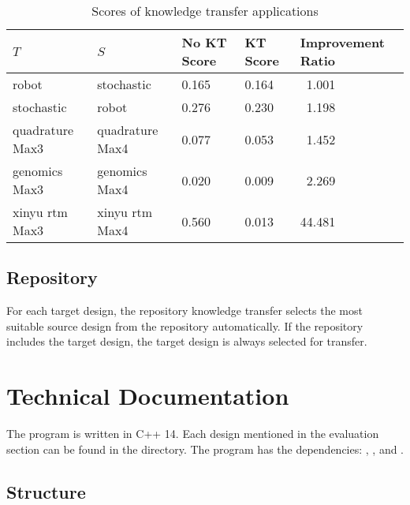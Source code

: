 \documentclass[10pt,a4paper]{article}
\begin{document}
\begin{table}[H]
	\begin{tabularx}{\linewidth}{X X X X X}
		\hline
		$T$ & $S$ & No KT Score & KT Score & Improvement Ratio\\
		\hline
		robot & stochastic & 0.165 & 0.164 & $\phantom{0}$1.001\\
		stochastic & robot & 0.276 & 0.230 & $\phantom{0}$1.198\\
		quadrature Max3 & quadrature Max4 & 0.077 & 0.053 & $\phantom{0}$1.452\\
		genomics Max3 & genomics Max4 & 0.020 & 0.009 & $\phantom{0}$2.269\\
		xinyu rtm Max3 & xinyu rtm Max4 & 0.560 & 0.013 & 44.481\\
		\hline
	\end{tabularx}
	\caption{Scores of knowledge transfer applications}
\end{table}

\subsection{Repository}

For each target design, the repository knowledge transfer selects the most suitable source design from the repository automatically. If the repository includes the target design, the target design is always selected for transfer.
\section{Technical Documentation}

The program is written in C++ 14. Each design mentioned in the evaluation section can be found in the  directory. The program has the dependencies: , ,  and .

\subsection{Structure}
\end{document}
